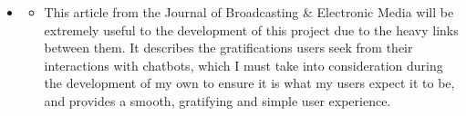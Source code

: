 \documentclass[12pt]{report}
\begin{document}
\begin{itemize}
        \item {}
        \begin{itemize}
            \item This article from the Journal of Broadcasting \& Electronic Media will be extremely useful to 
            the development of this project due to the heavy links between them. It describes the gratifications
            users seek from their interactions with chatbots, which I must take into consideration during the 
            development of my own to ensure it is what my users expect it to be, and provides a smooth, gratifying
            and simple user experience.
        \end{itemize}
    \end{itemize}

    \printbibliography
\end{document}

